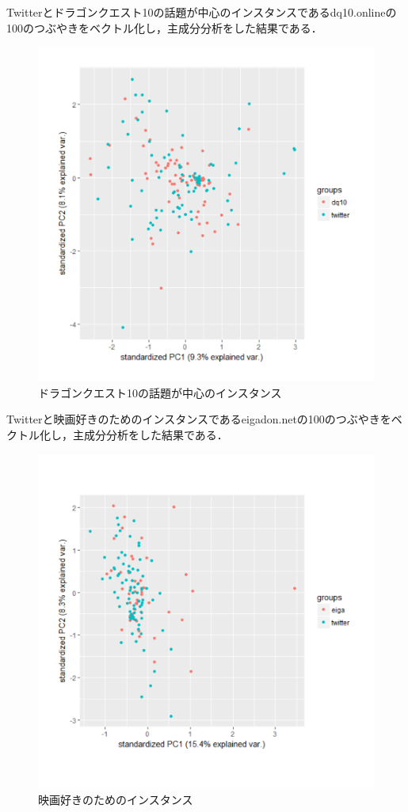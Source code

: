 Twitterとドラゴンクエスト10の話題が中心のインスタンスであるdq10.onlineの100のつぶやきをベクトル化し，主成分分析をした結果である．
\begin{figure}[h]
\centering
\includegraphics[width=13cm,clip]{dq10.pdf}
\caption{ドラゴンクエスト10の話題が中心のインスタンス}\label{dq10}
\end{figure}
\newpage

Twitterと映画好きのためのインスタンスであるeigadon.netの100のつぶやきをベクトル化し，主成分分析をした結果である．
\begin{figure}[h]
\centering
\includegraphics[width=13cm,clip]{eiga.pdf}
\caption{映画好きのためのインスタンス}\label{eiga}
\end{figure}
\newpage

